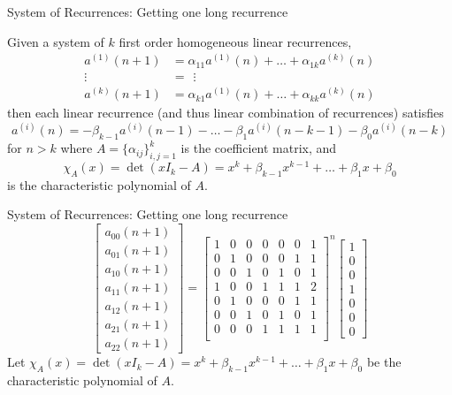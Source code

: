 \documentclass{beamer}%
\newcommand\indxx[2]{#1#2}
\begin{document}
\begin{frame}{System of Recurrences: Getting one long recurrence}
  \begin{theorem}
    Given a system of $k$ first order homogeneous linear recurrences, \begin{align*}
      a^{(1)}(n+1) &= \alpha_{11}a^{(1)}(n) + \hdots + \alpha_{1k}a^{(k)}(n) \\
      \vdots\hspace{5pt} &= \hspace{5pt}\vdots  \\
      a^{(k)}(n+1) &= \alpha_{k1}a^{(1)}(n) + \hdots + \alpha_{kk}a^{(k)}(n)
    \end{align*} then each linear recurrence (and thus linear combination of recurrences) satisfies \[
      a^{(i)}(n) = -\beta_{k-1}a^{(i)}(n-1) - \hdots -\beta_{1}a^{(i)}(n-k-1) - \beta_0 a^{(i)}(n-k)
    \] for $n > k$ where $A = \{\alpha_{ij}\}_{i,j=1}^k$ is the coefficient matrix, and \[
      \chi_A(x) = \det(xI_k - A) = x^k + \beta_{k-1}x^{k-1} + \hdots + \beta_1 x + \beta_0
    \] is the characteristic polynomial of $A$.
  \end{theorem}
\end{frame}

\begin{frame}{System of Recurrences: Getting one long recurrence}
  \[
    \begin{bmatrix}
      a_{\indxx 00}(n+1) \\
      a_{\indxx 01}(n+1) \\
      a_{\indxx 10}(n+1) \\
      a_{\indxx 11}(n+1) \\
      a_{\indxx 12}(n+1) \\
      a_{\indxx 21}(n+1) \\
      a_{\indxx 22}(n+1)
    \end{bmatrix}
    =
    \begin{bmatrix}
      1 & 0 & 0 & 0 & 0 & 0 & 1 \\ %
      0 & 1 & 0 & 0 & 0 & 1 & 1 \\ %
      0 & 0 & 1 & 0 & 1 & 0 & 1 \\ %
      1 & 0 & 0 & 1 & 1 & 1 & 2 \\ %
      0 & 1 & 0 & 0 & 0 & 1 & 1 \\ %
      0 & 0 & 1 & 0 & 1 & 0 & 1 \\ %
      0 & 0 & 0 & 1 & 1 & 1 & 1 \\ %
    \end{bmatrix}^n
    \begin{bmatrix}
      1 \\ 0 \\ 0 \\ 1 \\ 0 \\ 0 \\ 0
    \end{bmatrix}
  \]
  Let $\chi_A(x) = \det(xI_k - A) = x^k + \beta_{k-1}x^{k-1} + \hdots + \beta_1 x + \beta_0$ be the characteristic polynomial of $A$. %
\end{frame}
\end{document}

